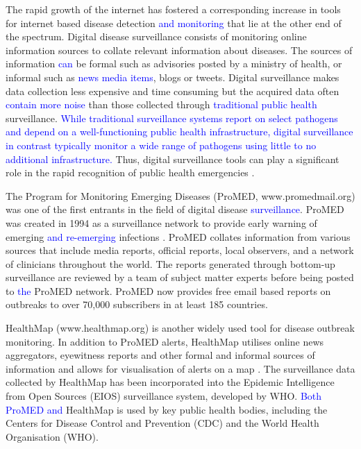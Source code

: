 \documentclass[9pt,twocolumn,twoside,lineno]{pnas-new}
\newcommand{\sangeeta}[1]{\textcolor{blue}{#1}}
\begin{document}
The rapid growth of the internet has fostered a corresponding increase
in tools for internet based disease detection \sangeeta{ and monitoring} 
that lie at the other end
of the spectrum. Digital disease surveillance consists of monitoring
online information sources to collate relevant information about
diseases. The sources of information \sangeeta{can} be formal such as advisories
posted by a ministry of health, or informal such as \sangeeta{news media
  items}, blogs or tweets.
Digital surveillance makes data collection less expensive and time
consuming but the acquired data often \sangeeta{contain more noise} than those
collected through \sangeeta{traditional public health} surveillance. \sangeeta{While traditional
  surveillance systems report on select pathogens and depend on a
  well-functioning public health infrastructure, digital surveillance
  in contrast typically monitor a wide range of pathogens using little
to no additional infrastructure.} Thus, digital surveillance tools
can play a significant role in the rapid recognition of public health
emergencies \cite{grein2000rumors, anema2014digital}.

The Program for Monitoring Emerging Diseases (ProMED,
www.promedmail.org) was one of the first entrants in the field of
digital disease \sangeeta{surveillance}. ProMED was created in 1994 as a surveillance
network to provide early warning of emerging \sangeeta{and re-emerging}
infections \cite{morse2012public}. ProMED collates information from
various sources that include media reports, official reports, local
observers, and a network of clinicians throughout the world. The reports
generated through bottom-up surveillance are reviewed by a team of
subject matter experts before being posted to \sangeeta{the} ProMED network. ProMED now
provides free email based reports on outbreaks to over 70,000
subscribers in at least 185 countries.

HealthMap (www.healthmap.org) is another widely used tool for disease
outbreak monitoring. In addition to ProMED alerts, HealthMap utilises
online news aggregators, eyewitness reports and other formal and
informal sources of information and allows for visualisation of alerts
on a map \cite{freifeld2008healthmap}. 
The surveillance data collected by HealthMap  has been incorporated into the Epidemic
Intelligence from Open Sources (EIOS) surveillance system, developed
by WHO. \sangeeta{Both ProMED and} HealthMap
is used by key public health bodies, including the Centers for Disease
Control and Prevention (CDC) and the World Health Organisation (WHO).
\end{document}
